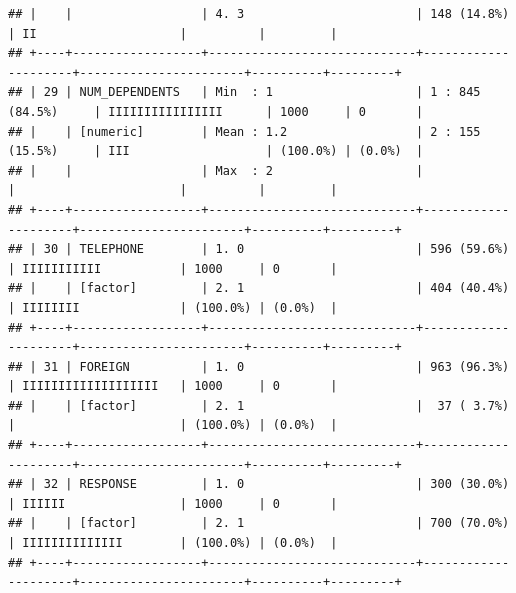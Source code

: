 \documentclass[
]{article}
\begin{document}
\begin{verbatim}
## |    |                  | 4. 3                        | 148 (14.8%)         | II                    |          |         |
## +----+------------------+-----------------------------+---------------------+-----------------------+----------+---------+
## | 29 | NUM_DEPENDENTS   | Min  : 1                    | 1 : 845 (84.5%)     | IIIIIIIIIIIIIIII      | 1000     | 0       |
## |    | [numeric]        | Mean : 1.2                  | 2 : 155 (15.5%)     | III                   | (100.0%) | (0.0%)  |
## |    |                  | Max  : 2                    |                     |                       |          |         |
## +----+------------------+-----------------------------+---------------------+-----------------------+----------+---------+
## | 30 | TELEPHONE        | 1. 0                        | 596 (59.6%)         | IIIIIIIIIII           | 1000     | 0       |
## |    | [factor]         | 2. 1                        | 404 (40.4%)         | IIIIIIII              | (100.0%) | (0.0%)  |
## +----+------------------+-----------------------------+---------------------+-----------------------+----------+---------+
## | 31 | FOREIGN          | 1. 0                        | 963 (96.3%)         | IIIIIIIIIIIIIIIIIII   | 1000     | 0       |
## |    | [factor]         | 2. 1                        |  37 ( 3.7%)         |                       | (100.0%) | (0.0%)  |
## +----+------------------+-----------------------------+---------------------+-----------------------+----------+---------+
## | 32 | RESPONSE         | 1. 0                        | 300 (30.0%)         | IIIIII                | 1000     | 0       |
## |    | [factor]         | 2. 1                        | 700 (70.0%)         | IIIIIIIIIIIIII        | (100.0%) | (0.0%)  |
## +----+------------------+-----------------------------+---------------------+-----------------------+----------+---------+
\end{verbatim}
\end{document}
